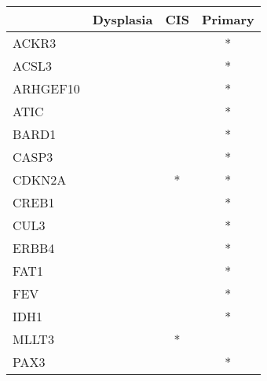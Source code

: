 \begin{tabular}{lccc}
\toprule
{} & Dysplasia & CIS & Primary \\
\midrule
ACKR3    &           &     &       * \\
ACSL3    &           &     &       * \\
ARHGEF10 &           &     &       * \\
ATIC     &           &     &       * \\
BARD1    &           &     &       * \\
CASP3    &           &     &       * \\
CDKN2A   &           &   * &       * \\
CREB1    &           &     &       * \\
CUL3     &           &     &       * \\
ERBB4    &           &     &       * \\
FAT1     &           &     &       * \\
FEV      &           &     &       * \\
IDH1     &           &     &       * \\
MLLT3    &           &   * &         \\
PAX3     &           &     &       * \\
\bottomrule
\end{tabular}
